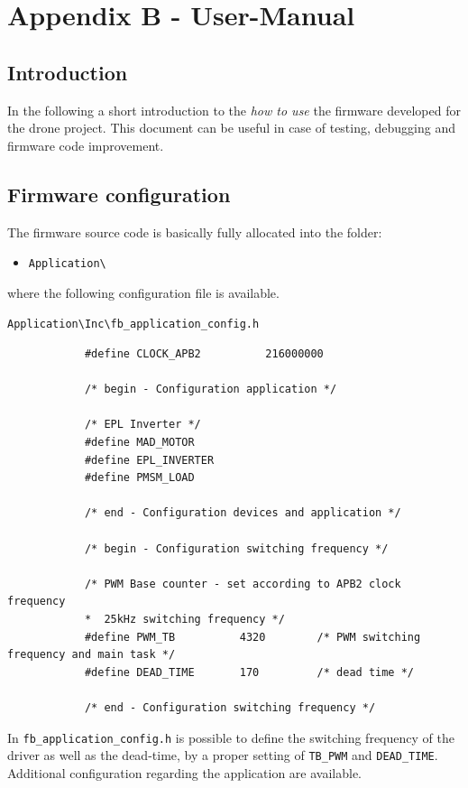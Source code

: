 \documentclass[11pt,a4paper,oneside]{book}
\numberwithin{equation}{section}
\theoremstyle{it}
\theoremstyle{definition}
\begin{document}
\chapter{Appendix B - User-Manual}
\section{Introduction}	
In the following a short introduction to the \textit{how to use} the firmware developed for the drone project. This document can be useful in case of testing, debugging and firmware code improvement.

\section{Firmware configuration}	
The firmware source code is basically fully allocated into the folder:
\begin{itemize}
	\item[--] {\selectfont \verb+Application\+}
\end{itemize}	
where the following configuration file is available. 
\begin{mybox}
		{\selectfont \verb+Application\Inc\fb_application_config.h+}
	{\selectfont \footnotesize \noindent
		\begin{verbatim}
			#define CLOCK_APB2 			216000000
			
			/* begin - Configuration application */
			
			/* EPL Inverter */
			#define MAD_MOTOR
			#define EPL_INVERTER
			#define PMSM_LOAD
			
			/* end - Configuration devices and application */
			
			/* begin - Configuration switching frequency */
			
			/* PWM Base counter - set according to APB2 clock frequency
			*  25kHz switching frequency */
			#define PWM_TB 			4320 		/* PWM switching frequency and main task */
			#define DEAD_TIME 		170 		/* dead time */
			
			/* end - Configuration switching frequency */
	\end{verbatim}}
\end{mybox}

In {\selectfont \verb+fb_application_config.h+} is possible to define the switching frequency of the driver as well as the dead-time, by a proper setting of \texttt{TB\_PWM} and \texttt{DEAD\_TIME}. Additional configuration regarding the application are available.
\end{document}
